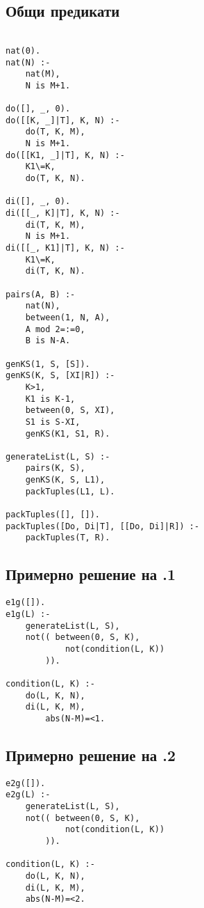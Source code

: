 \documentclass[]{article}
\newenvironment{longlisting}{\captionsetup{type=listing}}{}
\begin{document}
\subsection{Общи предикати}
\begin{longlisting}
\begin{verbatim}

nat(0).
nat(N) :-
    nat(M),
    N is M+1.

do([], _, 0).
do([[K, _]|T], K, N) :-
    do(T, K, M),
    N is M+1.
do([[K1, _]|T], K, N) :-
    K1\=K,
    do(T, K, N).

di([], _, 0).
di([[_, K]|T], K, N) :-
    di(T, K, M),
    N is M+1.
di([[_, K1]|T], K, N) :-
    K1\=K,
    di(T, K, N).

pairs(A, B) :-
    nat(N),
    between(1, N, A),
    A mod 2=:=0,
    B is N-A.

genKS(1, S, [S]).
genKS(K, S, [XI|R]) :-
    K>1,
    K1 is K-1,
    between(0, S, XI),
    S1 is S-XI,
    genKS(K1, S1, R). 

generateList(L, S) :-
    pairs(K, S),
    genKS(K, S, L1),
    packTuples(L1, L).

packTuples([], []).
packTuples([Do, Di|T], [[Do, Di]|R]) :-
    packTuples(T, R).

\end{verbatim}
\end{longlisting}

\vskip 0.2in

\subsection{Примерно решение на .1} 
\begin{longlisting}
\begin{verbatim}
e1g([]).
e1g(L) :-
    generateList(L, S),
    not(( between(0, S, K),
            not(condition(L, K))
        )).

condition(L, K) :-
    do(L, K, N),
    di(L, K, M),
        abs(N-M)=<1.
\end{verbatim}
\end{longlisting}

\vskip 0.2in

\subsection{Примерно решение на .2} 
\begin{longlisting}
\begin{verbatim}
e2g([]).
e2g(L) :-
    generateList(L, S),
    not(( between(0, S, K),
            not(condition(L, K))
        )).

condition(L, K) :-
    do(L, K, N),
    di(L, K, M),
    abs(N-M)=<2.
\end{verbatim}
\end{longlisting}
\end{document}
